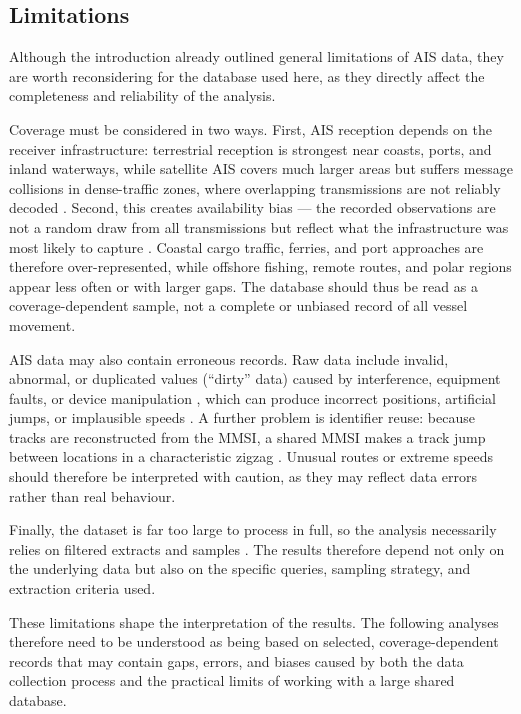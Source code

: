 \documentclass[10pt,a4paper]{article}
\begin{document}

\subsection{Limitations}

Although the introduction already outlined general limitations of AIS data, they are
worth reconsidering for the database used here, as they directly affect the
completeness and reliability of the analysis.

Coverage must be considered in two ways. First, AIS reception depends on the receiver
infrastructure: terrestrial reception is strongest near coasts, ports, and inland
waterways, while satellite AIS covers much larger areas but suffers message collisions
in dense-traffic zones, where overlapping transmissions are not reliably decoded \cite{4,5}.
Second, this creates availability bias --- the recorded observations are not a random
draw from all transmissions but reflect what the infrastructure was most likely to
capture \cite{8}. Coastal cargo traffic, ferries, and port approaches are therefore
over-represented, while offshore fishing, remote routes, and polar regions appear less
often or with larger gaps. The database should thus be read as a coverage-dependent
sample, not a complete or unbiased record of all vessel movement.

AIS data may also contain erroneous records. Raw data include invalid, abnormal, or
duplicated values (``dirty'' data) caused by interference, equipment faults, or device
manipulation \cite{9}, which can produce incorrect positions, artificial jumps, or
implausible speeds \cite{10}. A further problem is identifier reuse: because tracks are
reconstructed from the MMSI, a shared MMSI makes a track jump between locations in a
characteristic zigzag \cite{9,10}. Unusual routes or extreme speeds should therefore be
interpreted with caution, as they may reflect data errors rather than real behaviour.

Finally, the dataset is far too large to process in full, so the analysis necessarily
relies on filtered extracts and samples \cite{11}. The results therefore depend not only on
the underlying data but also on the specific queries, sampling strategy, and extraction
criteria used.

These limitations shape the interpretation of the results. The following analyses therefore need to be understood as being based on selected, coverage-dependent records 
that may contain gaps, errors, and biases caused by both the data collection process and the practical limits of working with a large shared database.
\end{document}
